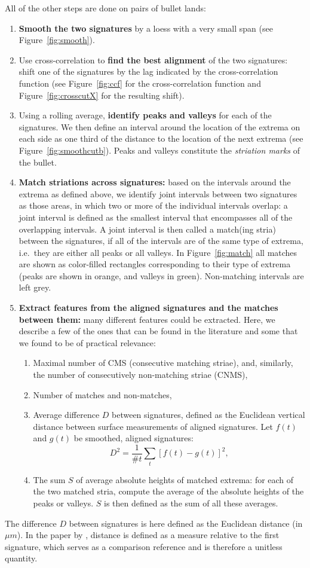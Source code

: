 \documentclass[aoas, preprint]{imsart}\usepackage[]{graphicx}\usepackage[]{color}
\begin{document}
All of the other steps are done on pairs of bullet lands:
\begin{enumerate}
\item {\bf Smooth the two signatures} by a loess with a very small span (see Figure~\ref{fig:smooth}). 
\item Use cross-correlation to {\bf find the best alignment} of the two signatures: shift one of the signatures by the lag indicated by the cross-correlation function (see Figure~\ref{fig:ccf} for the cross-correlation function and Figure~\ref{fig:crosscutX} for the resulting shift).
\item Using a rolling average, {\bf identify peaks and valleys} for each of the signatures. We then define an interval around the location of the extrema on each side as one third of the distance to the location of the next extrema (see Figure~\ref{fig:smoothcutb}). Peaks and valleys constitute the \emph{striation marks} of the bullet.
\item {\bf Match striations across signatures:} based on the intervals around the extrema as defined above, we identify joint intervals between two signatures as those areas, in which two or more of the individual intervals overlap: a joint interval is defined as the smallest interval that encompasses all of the overlapping intervals. A joint interval is then called a match(ing stria) between the signatures, if all of the intervals are of the same type of extrema, i.e.\ they are either all peaks or all valleys. In Figure~\ref{fig:match} all matches are shown as color-filled rectangles corresponding to their type of extrema (peaks are shown in orange, and valleys in green). Non-matching intervals are left grey. 
\item {\bf Extract features from the aligned signatures and the matches between them:} many different features could be extracted. Here, we describe a few of the ones that can be found in the literature and some that we found to be of practical relevance:
\begin{enumerate}[label=(\roman*)]
\item Maximal number of CMS (consecutive matching striae), and, similarly, the number of consecutively non-matching striae (CNMS), 
\item Number of matches and non-matches,
\item Average difference $D$ between signatures, defined as the Euclidean vertical distance between surface measurements of aligned signatures. Let $f(t)$ and $g(t)$ be smoothed, aligned signatures:
\[
D^2 = \frac{1}{\text{\#}t}\sum_t \left[f(t) - g(t)\right]^2,
\]
\item The sum $S$ of average absolute heights of matched extrema: for each of the two matched stria, compute the average of the absolute heights of the peaks or valleys. $S$ is then defined as the sum of all these averages. 
\end{enumerate}
\end{enumerate}
%
The difference $D$ between signatures is here defined as the Euclidean distance (in $\mu m$). In the paper by \citet{ma:2004}, distance is defined as a measure relative to the first signature, which serves as a comparison reference and is therefore a unitless quantity. 
\end{document}
